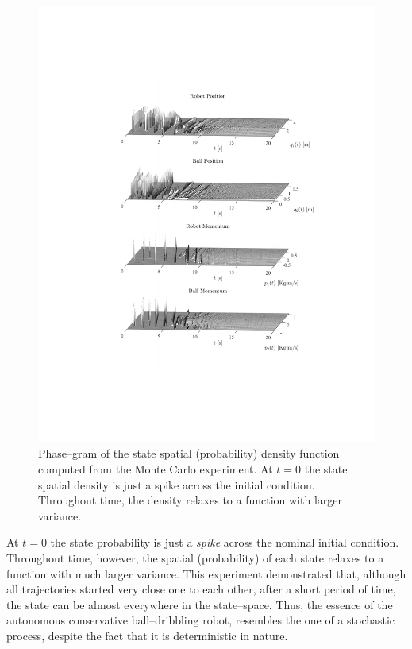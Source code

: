 \begin{figure}[!ht]
	\centering
	\includegraphics[width = 1\linewidth, trim={5cm 5.75cm 3.9cm 5.5cm},clip]{Figures/PhaseGram.pdf}
	\caption[Phase--gram of the state spatial density function]{Phase--gram of the state spatial (probability) density function computed from the Monte Carlo experiment. At $t=0$ the state spatial density is just a spike across the initial condition. Throughout time, the density relaxes to a function with larger variance.}
	\label{fig:phasegram}
\end{figure}
%

At $t=0$ the state probability is just a \textit{spike} across the nominal initial condition. Throughout time, however, the spatial (probability) of each state relaxes to a function with much larger variance.
This experiment demonstrated that, although all trajectories started very close one to each other, after a short period of time, the state can be almost everywhere in the state--space. Thus, the essence of the autonomous conservative ball--dribbling robot, resembles the one of a stochastic process, despite the fact that  it is deterministic in nature.
\clearpage
